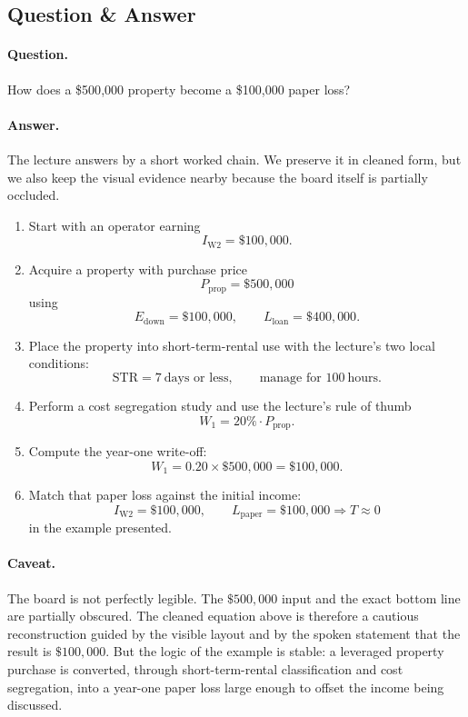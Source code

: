 \subsection{Question \& Answer}

\paragraph{Question.} How does a \$500{,}000 property become a \$100{,}000 paper loss?

\paragraph{Answer.} The lecture answers by a short worked chain. We preserve it in cleaned form, but we also keep the visual evidence nearby because the board itself is partially occluded.

\begin{enumerate}
\item Start with an operator earning
\[
I_{\mathrm{W2}}=\$100{,}000.
\]

\item Acquire a property with purchase price
\[
P_{\mathrm{prop}}=\$500{,}000
\]
using
\[
E_{\mathrm{down}}=\$100{,}000,
\qquad
L_{\mathrm{loan}}=\$400{,}000.
\]

\item Place the property into short-term-rental use with the lecture's two local conditions:
\[
\mathrm{STR}=7\ \text{days or less},
\qquad
\text{manage for }100\ \text{hours}.
\]

\item Perform a cost segregation study and use the lecture's rule of thumb
\[
W_{1}=20\%\cdot P_{\mathrm{prop}}.
\]

\item Compute the year-one write-off:
\[
W_{1}=0.20\times \$500{,}000=\$100{,}000.
\]

\item Match that paper loss against the initial income:
\[
I_{\mathrm{W2}}=\$100{,}000,
\qquad
L_{\mathrm{paper}}=\$100{,}000
\Rightarrow
T\approx 0
\]
in the example presented.
\end{enumerate}

\paragraph{Caveat.} The board is not perfectly legible. The \(\$500{,}000\) input and the exact bottom line are partially obscured. The cleaned equation above is therefore a cautious reconstruction guided by the visible layout and by the spoken statement that the result is \(\$100{,}000\). But the logic of the example is stable: a leveraged property purchase is converted, through short-term-rental classification and cost segregation, into a year-one paper loss large enough to offset the income being discussed.

